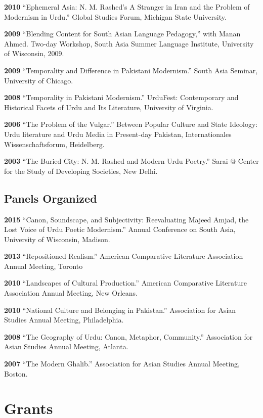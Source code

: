\documentclass[letterpaper,12pt]{article}
\begin{document}
\textbf{2010}
“Ephemeral Asia:
N. M. Rashed’s A Stranger in Iran and the Problem of Modernism in Urdu.”
Global Studies Forum, Michigan State University.

\textbf{2009}
“Blending Content for South Asian Language Pedagogy,”
with Manan Ahmed.
Two-day Workshop, South Asia Summer Language Institute,
University of Wisconsin, 2009.

\textbf{2009}
“Temporality and Difference in Pakistani Modernism.”
South Asia Seminar, University of Chicago.

\textbf{2008}
“Temporality in Pakistani Modernism.”
UrduFest: Contemporary and Historical Facets of Urdu and Its Literature,
University of Virginia.

\textbf{2006}
“The Problem of the Vulgar.”
Between Popular Culture and State Ideology:
Urdu literature and Urdu Media in Present-day Pakistan,
Internationales Wissenschaftsforum, Heidelberg.

\textbf{2003}
“The Buried City: N. M. Rashed and Modern Urdu Poetry.”
Sarai @ Center for the Study of Developing Societies, New Delhi.


\subsection{Panels Organized%
  \label{panels-organized}%
}

\textbf{2015}
“Canon, Soundscape, and Subjectivity: Reevaluating Majeed Amjad, the Lost Voice of Urdu Poetic Modernism.”
Annual Conference on South Asia, University of Wisconsin, Madison.

\textbf{2013}
“Repositioned Realism.”
American Comparative Literature Association Annual Meeting, Toronto

\textbf{2010}
“Landscapes of Cultural Production.”
American Comparative Literature Association Annual Meeting, New Orleans.

\textbf{2010}
“National Culture and Belonging in Pakistan.”
Association for Asian Studies Annual Meeting, Philadelphia.

\textbf{2008}
“The Geography of Urdu: Canon, Metaphor, Community.”
Association for Asian Studies Annual Meeting, Atlanta.

\textbf{2007}
“The Modern Ghalib.”
Association for Asian Studies Annual Meeting, Boston.


\section{Grants%
  \label{grants}%
}
\end{document}
